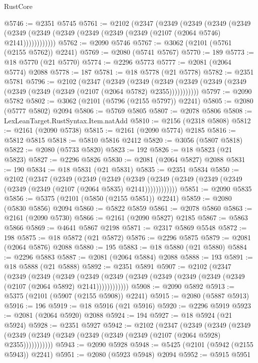 \begin{lexlean}{RustCore}
\begin{coremodule}
@5746 := @2351 @5745
@5761 := @2102
    (@2347
      (@2349
        (@2349
          (@2349
            (@2349 (@2349 (@2349 (@2349 (@2349 (@2349 (@2349 (@2107 (@2064 @5746) @2141))))))))))))
@5762 := @2090 @5746
@5767 := @3062 (@2101 (@5761 (@2155 @5762)) @2241)
@5769 := @2080 (@5741 @5767)
@5770 := 189
@5773 := @18 @5770 (@21 @5770)
@5774 := @2296 @5773
@5777 := @2081 (@2064 @5774) @2088
@5778 := 187
@5781 := @18 @5778 (@21 @5778)
@5782 := @2351 @5781
@5796 := @2102
    (@2347
      (@2349
        (@2349
          (@2349 (@2349 (@2349 (@2349 (@2349 (@2349 (@2349 (@2107 (@2064 @5782) @2355)))))))))))
@5797 := @2090 @5782
@5802 := @3062 (@2101 (@5796 (@2155 @5797)) @2241)
@5805 := @2080 (@5777 @5802) @2094
@5806 := @5769 @5805
@5807 := @2078 @5806
@5808 := LexLeanTarget.RustSyntax.Item.natAdd
@5810 := @2156 (@2318 @5808)
@5812 := @2161 (@2090 @5738)
@5815 := @2161 (@2090 @5774) @2185
@5816 := @5812 @5815
@5818 := @5810 @5816 @2412
@5820 := @3056 (@5807 @5818)
@5822 := @2080 (@5733 @5820)
@5823 := 192
@5826 := @18 @5823 (@21 @5823)
@5827 := @2296 @5826
@5830 := @2081 (@2064 @5827) @2088
@5831 := 190
@5834 := @18 @5831 (@21 @5831)
@5835 := @2351 @5834
@5850 := @2102
    (@2347
      (@2349
        (@2349
          (@2349
            (@2349 (@2349 (@2349 (@2349 (@2349 (@2349 (@2349 (@2107 (@2064 @5835) @2141))))))))))))
@5851 := @2090 @5835
@5856 := @5375 (@2101 (@5850 (@2155 @5851)) @2241)
@5859 := @2080 (@5830 @5856) @2094
@5860 := @5822 @5859
@5861 := @2078 @5860
@5863 := @2161 (@2090 @5730)
@5866 := @2161 (@2090 @5827) @2185
@5867 := @5863 @5866
@5869 := @4641 @5867 @2198
@5871 := @2317 @5869 @5548
@5872 := 198
@5875 := @18 @5872 (@21 @5872)
@5876 := @2296 @5875
@5879 := @2081 (@2064 @5876) @2088
@5880 := 195
@5883 := @18 @5880 (@21 @5880)
@5884 := @2296 @5883
@5887 := @2081 (@2064 @5884) @2088
@5888 := 193
@5891 := @18 @5888 (@21 @5888)
@5892 := @2351 @5891
@5907 := @2102
    (@2347
      (@2349
        (@2349
          (@2349
            (@2349 (@2349 (@2349 (@2349 (@2349 (@2349 (@2349 (@2107 (@2064 @5892) @2141))))))))))))
@5908 := @2090 @5892
@5913 := @5375 (@2101 (@5907 (@2155 @5908)) @2241)
@5915 := @2080 (@5887 @5913)
@5916 := 196
@5919 := @18 @5916 (@21 @5916)
@5920 := @2296 @5919
@5923 := @2081 (@2064 @5920) @2088
@5924 := 194
@5927 := @18 @5924 (@21 @5924)
@5928 := @2351 @5927
@5942 := @2102
    (@2347
      (@2349
        (@2349
          (@2349 (@2349 (@2349 (@2349 (@2349 (@2349 (@2349 (@2107 (@2064 @5928) @2355)))))))))))
@5943 := @2090 @5928
@5948 := @5425 (@2101 (@5942 (@2155 @5943)) @2241)
@5951 := @2080 (@5923 @5948) @2094
@5952 := @5915 @5951

\end{coremodule}
\end{lexlean}
